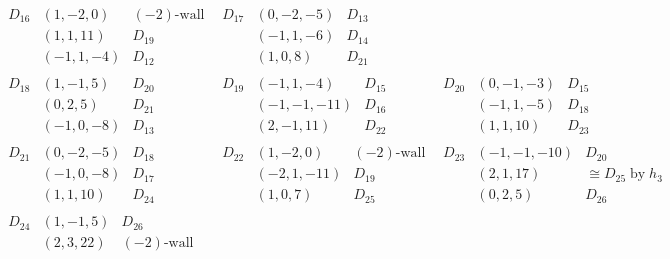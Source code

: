 $$\begin{array}{lll}
\begin{array}{lll}
D_{16} &(1,-2,0) &\textrm{$(-2)$-wall}\\ 
   &(1,1,11) &D_{19}\\ 
   &(-1,1,-4) &\textrm{$D_{12}$}
\end{array}
&
\begin{array}{lll}
D_{17} &(0,-2,-5) &\textrm{$D_{13}$}\\ 
   &(-1,1,-6) &D_{14}\\ 
   &(1,0,8) &D_{21}
\end{array}
\\ 
\hline
\begin{array}{lll}
D_{18} &(1,-1,5) &D_{20}\\ 
   &(0,2,5) &D_{21}\\ 
   &(-1,0,-8) &\textrm{$D_{13}$}
\end{array}
&
\begin{array}{lll}
D_{19} &(-1,1,-4) &\textrm{$D_{15}$}\\ 
   &(-1,-1,-11) &D_{16}\\ 
   &(2,-1,11) &D_{22}
\end{array}
&
\begin{array}{lll}
D_{20} &(0,-1,-3) &\textrm{$D_{15}$}\\ 
   &(-1,1,-5) &D_{18}\\ 
   &(1,1,10) &D_{23}
\end{array}
\\ 
\hline
\begin{array}{lll}
D_{21} &(0,-2,-5) &D_{18}\\ 
   &(-1,0,-8) &\textrm{$D_{17}$}\\ 
   &(1,1,10) &D_{24}
\end{array}
&
\begin{array}{lll}
D_{22} &(1,-2,0) &\textrm{$(-2)$-wall}\\ 
   &(-2,1,-11) &\textrm{$D_{19}$}\\ 
   &(1,0,7) &D_{25}
\end{array}
&
\begin{array}{lll}
D_{23} &(-1,-1,-10) &\textrm{$D_{20}$}\\ 
   &(2,1,17) &\cong D_{25}\;\textrm{by}\; h_{3}\\ 
   &(0,2,5) &D_{26}
\end{array}
\\ 
\hline
\begin{array}{lll}
D_{24} &(1,-1,5) &D_{26}\\ 
   &(2,3,22) &\textrm{$(-2)$-wall}\\ 

\end{array}
\end{array}$$
